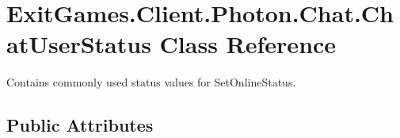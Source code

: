 \hypertarget{class_exit_games_1_1_client_1_1_photon_1_1_chat_1_1_chat_user_status}{}\section{Exit\+Games.\+Client.\+Photon.\+Chat.\+Chat\+User\+Status Class Reference}
\label{class_exit_games_1_1_client_1_1_photon_1_1_chat_1_1_chat_user_status}


Contains commonly used status values for Set\+Online\+Status.  


\subsection*{Public Attributes}
